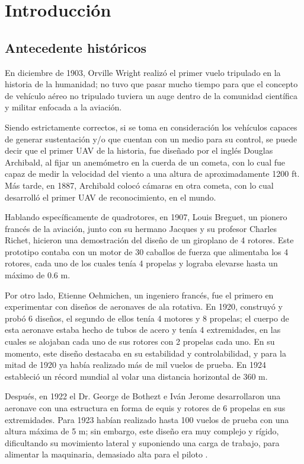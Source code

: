 \chapter{Introducción}

\section{Antecedente históricos}
En diciembre de 1903, Orville Wright realizó el primer vuelo tripulado en la historia de la humanidad; no tuvo que pasar mucho tiempo para que el concepto de vehículo aéreo no tripulado tuviera un auge dentro de la comunidad científica y militar enfocada a la aviación.

Siendo estrictamente correctos, si se toma en consideración los vehículos capaces de generar sustentación y/o que cuentan con un medio para su control, se puede decir que el primer UAV de la historia, fue diseñado por el inglés Douglas Archibald, al fijar un anemómetro en la cuerda de un cometa, con lo cual fue capaz de medir  la velocidad del viento a una altura de aproximadamente 1200 ft. Más tarde, en 1887, Archibald colocó cámaras en otra cometa, con lo cual desarrolló el primer UAV de reconocimiento, en el mundo.

Hablando específicamente de quadrotores, en 1907, Louis Breguet, un pionero francés de la aviación, junto con su hermano Jacques y su profesor Charles Richet, hicieron una demostración del diseño de un giroplano de 4 rotores. Este prototipo contaba con un motor de 30 caballos de fuerza que alimentaba los 4 rotores, cada uno de los cuales tenía 4 propelas y lograba elevarse hasta un máximo de 0.6 m.

Por otro lado, Etienne Oehmichen, un ingeniero francés, fue el primero en experimentar con diseños de aeronaves de ala rotativa. En 1920, construyó y probó 6 diseños, el segundo de ellos tenía 4 motores y 8 propelas; el cuerpo de esta aeronave estaba hecho de tubos de acero y tenía 4 extremidades, en las cuales se alojaban cada uno de sus rotores con 2 propelas cada uno. En su momento, este diseño destacaba en su estabilidad y controlabilidad, y para la mitad de 1920 ya había realizado más de mil vuelos de prueba. En 1924 estableció un récord mundial al volar una distancia horizontal de 360 m.

Después, en 1922 el Dr. George de Bothezt e Iván Jerome desarrollaron una aeronave con una estructura en forma de equis y rotores de 6 propelas en sus extremidades. Para 1923 habían realizado hasta 100 vuelos de prueba con una altura máxima de 5 m; sin embargo, este diseño era muy complejo y rígido, dificultando su movimiento lateral y suponiendo una  carga de trabajo, para alimentar la maquinaria, demasiado alta para el piloto \cite{krossblade}.


